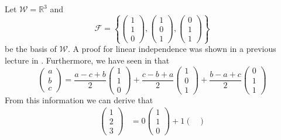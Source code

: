\begin{exm}
	Let $\mathcal{W}=\mathbb{R}^3$ and
	\begin{equation*}
		\mathcal{F}=\left\{
		\begin{pmatrix}
			1 \\1\\0
		\end{pmatrix},
		\begin{pmatrix}
			1 \\0\\1
		\end{pmatrix},
		\begin{pmatrix}
			0 \\1\\1
		\end{pmatrix}
		\right\}
	\end{equation*}
	be the basis of $\mathcal{W}$. A proof for linear independence was shown
	in a previous lecture in .
	Furthermore, we have seen in  that
	\begin{equation*}
		\begin{pmatrix}
			a \\b\\c
		\end{pmatrix}=
		\frac{a-c+b}{2}\begin{pmatrix}
			1 \\1\\0
		\end{pmatrix}+
		\frac{c-b+a}{2}\begin{pmatrix}
			1 \\0\\1
		\end{pmatrix}+
		\frac{b-a+c}{2}\begin{pmatrix}
			0 \\1\\1
		\end{pmatrix}
	\end{equation*}
	From this information we can derive that
	\begin{align*}
		\begin{pmatrix}
			1 \\2\\3
		\end{pmatrix} & =
		0\begin{pmatrix}
			1 \\1\\0
		\end{pmatrix}+
		1\begin{pmatrix}

\end{pmatrix}
\end{align*}
\end{exm}
